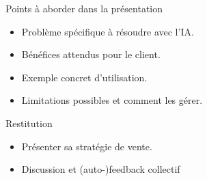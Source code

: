 \begin{frame}{Points à aborder dans la présentation}
\begin{itemize}
    \item Problème spécifique à résoudre avec l'IA.
    \item Bénéfices attendus pour le client.
    \item Exemple concret d'utilisation.
    \item Limitations possibles et comment les gérer.
\end{itemize}
\end{frame}

\begin{frame}{Restitution}
\begin{itemize}
    \item Présenter sa stratégie de vente.
    \item Discussion et (auto-)feedback collectif
\end{itemize}
\end{frame}


